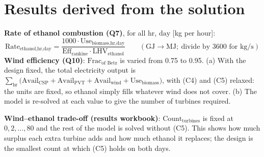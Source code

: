 \documentclass[11pt,a4paper]{article}
\newcommand{\T}[1]{\text{#1}}
\begin{document}
\section{Results derived from the solution}
\textbf{Rate of ethanol combustion (Q7)}, for all $\T{hr}$, $\T{day}$ [kg per hour]:
\[
\T{Rate}_{\T{ethanol,hr,day}}=\frac{1000\cdot\T{Use}_{\T{biomass,hr,day}}}{\T{Eff}_{\T{rankine}}\cdot\T{LHV}_{\T{ethanol}}}
\qquad(\text{GJ}\to\text{MJ};\ \text{divide by }3600\text{ for kg/s})
\]
\textbf{Wind efficiency (Q10)}: $\T{Frac}_{\T{of Betz}}$ is varied from 0.75 to 0.95. (a) With the design fixed, the total electricity output is $\sum_{\T{hr}}\big(\T{Avail}_{\T{CSP}}+\T{Avail}_{\T{PVT}}+\T{Avail}_{\T{wind}}+\T{Use}_{\T{biomass}}\big)$, with (C4) and (C5) relaxed: the units are fixed, so ethanol simply fills whatever wind does not cover. (b) The model is re-solved at each value to give the number of turbines required.

\textbf{Wind--ethanol trade-off (results workbook)}: $\T{Count}_{\T{turbines}}$ is fixed at $0,2,\dots,80$ and the rest of the model is solved without (C5). This shows how much surplus each extra turbine adds and how much ethanol it replaces; the design is the smallest count at which (C5) holds on both days.
\end{document}
